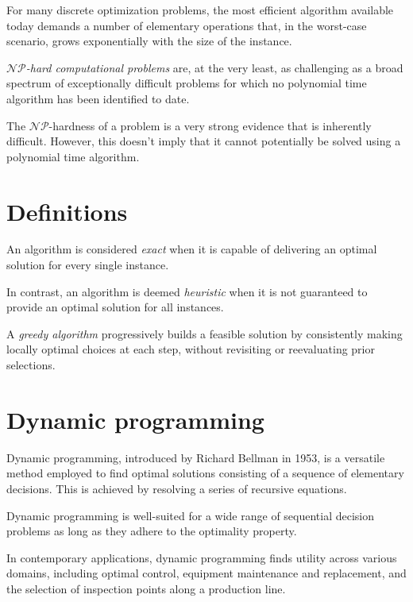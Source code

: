 \documentclass[12pt, a4paper]{report}
\begin{document}
    For many discrete optimization problems, the most efficient algorithm available today demands a number of elementary operations that, in the worst-case scenario, grows exponentially with the size of the instance.
    \begin{definition}
        \emph{$\mathcal{NP}$-hard computational problems} are, at the very least, as challenging as a broad spectrum of exceptionally difficult problems for which no polynomial time algorithm has been identified to date.
    \end{definition}
    The $\mathcal{N}\mathcal{P}$-hardness of a problem is a very strong evidence that is inherently difficult. 
    However, this doesn't imply that it cannot potentially be solved using a polynomial time algorithm.

    \section{Definitions}
    \begin{definition}
        An algorithm is considered \emph{exact} when it is capable of delivering an optimal solution for every single instance.

        In contrast, an algorithm is deemed \emph{heuristic} when it is not guaranteed to provide an optimal solution for all instances.

        A \emph{greedy algorithm} progressively builds a feasible solution by consistently making locally optimal choices at each step, without revisiting or reevaluating prior selections.
    \end{definition}

    \section{Dynamic programming}
    Dynamic programming, introduced by Richard Bellman in 1953, is a versatile method employed to find optimal solutions consisting of a sequence of elementary decisions.
    This is achieved by resolving a series of recursive equations.

    Dynamic programming is well-suited for a wide range of sequential decision problems as long as they adhere to the optimality property.
    
    In contemporary applications, dynamic programming finds utility across various domains, including optimal control, equipment maintenance and replacement, and the selection of inspection points along a production line.
\end{document}
